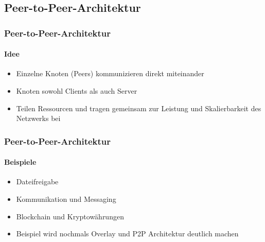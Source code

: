 \subsection{Peer-to-Peer-Architektur}
\begin{frame}
  \frametitle{Peer-to-Peer-Architektur}
  \framesubtitle{Idee}
  \begin{itemize}
    \item Einzelne Knoten (Peers) kommunizieren direkt miteinander 
    \item Knoten sowohl Clients als auch Server
    \item Teilen Ressourcen und tragen gemeinsam zur Leistung und Skalierbarkeit des Netzwerks bei
  \end{itemize}
\end{frame}
\begin{frame}
  \frametitle{Peer-to-Peer-Architektur}
  \framesubtitle{Beispiele}
  \begin{itemize}
    \item Dateifreigabe
    \item Kommunikation und Messaging
    \item Blockchain und Kryptowährungen
    \item Beispiel wird nochmals Overlay und P2P Architektur deutlich machen
  \end{itemize}
\end{frame}